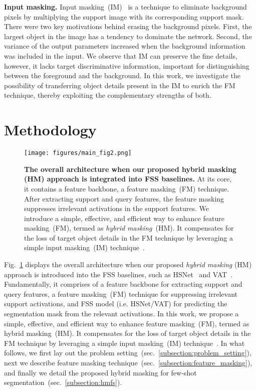 \documentclass[runningheads]{llncs}
\begin{document}
\noindent \textbf{Input masking.} Input masking~(IM)~\cite{OSLSM} is a technique to eliminate background pixels by multiplying the support image with its corresponding support mask. There were two key motivations behind erasing the background pixels. First, the largest object in the image has a tendency to dominate the network. Second, the variance of the output parameters increased when the background information was included in the input. We observe that IM can preserve the fine details, however, it lacks target discriminative information, important for distinguishing between the foreground and the background. In this work, we investigate the possibility of transferring object details present in the IM to enrich the FM technique, thereby exploiting the complementary strengths of both.






\section{Methodology}
\begin{figure}[t]
\centering
\texttt{[image: figures/main\_fig2.png]}
\caption{ \small \textbf{The overall architecture when our proposed hybrid masking (HM) approach is integrated into FSS baselines.} At its core, it contains a feature backbone, a feature masking~(FM) technique. After extracting support and query features, the feature masking suppresses irrelevant activations in the support features. We introduce a simple, effective, and efficient way to enhance feature masking~(FM), termed as \emph{hybrid masking}~(HM). It compensates for the loss of target object details in the FM technique by leveraging a simple input masking~(IM) technique~\cite{OSLSM}.}

\label{fig:overall_architecture}
\end{figure}

Fig.~\ref{fig:overall_architecture} displays the overall architecture when our proposed \emph{hybrid masking} (HM) approach is introduced into the FSS baselines, such as HSNet~\cite{HSNet} and VAT~\cite{VAT}. Fundamentally, it comprises of a feature backbone for extracting support and query features, a feature masking~(FM) technique for suppressing irrelevant support activations, and FSS model (i.e. HSNet/VAT) for predicting the segmentation mask from the relevant activations. In this work, we propose a simple, effective, and efficient way to enhance feature masking~(FM), termed as hybrid masking~(HM). It compensates for the loss of target object details in the FM technique by leveraging a simple input masking~(IM) technique~\cite{OSLSM}. 
In what follows, we first lay out the problem setting~(sec.~\ref{subsection:problem_setting}), next we describe feature masking technique~(sec.~\ref{subsection:feature_masking}), and finally we detail the proposed hybrid masking for few-shot segmentation~(sec.~\ref{subsection:hmfs}).
\end{document}
